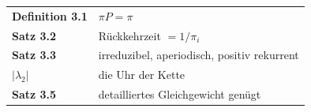 \begin{merksatz}
\begin{center}
\renewcommand{\arraystretch}{1.5}
\begin{tabular}{@{}P{3.0cm}P{5.6cm}@{}}
\toprule
\textbf{Definition 3.1} & $\pi P = \pi$\\
\textbf{Satz 3.2} & Rückkehrzeit $= 1/\pi_i$\\
\textbf{Satz 3.3} & irreduzibel, aperiodisch, positiv rekurrent\\
\textbf{$|\lambda_2|$} & die Uhr der Kette\\
\textbf{Satz 3.5} & detailliertes Gleichgewicht genügt\\
\bottomrule
\end{tabular}
\end{center}

\begin{center}
\begin{minipage}{0.88\textwidth}
\end{minipage}
\end{center}
\end{merksatz}
